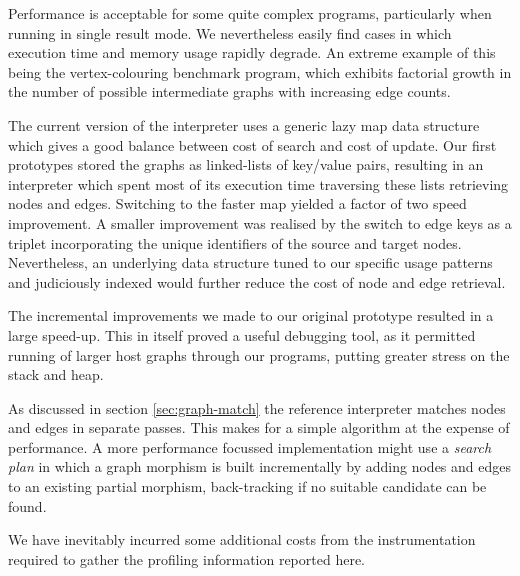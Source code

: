 Performance is acceptable for some quite complex programs, particularly when running in single result mode. We nevertheless easily find cases in which execution time and memory usage rapidly degrade. An extreme example of this being the vertex-colouring benchmark program, which exhibits factorial growth in the number of possible intermediate graphs with increasing edge counts.

The current version of the interpreter uses a generic lazy map data structure which gives a good balance between cost of search and cost of update. Our first prototypes stored the graphs as linked-lists of key/value pairs, resulting in an interpreter which spent most of its execution time traversing these lists retrieving nodes and edges. Switching to the faster map yielded a factor of two speed improvement. A smaller improvement was realised by the switch to edge keys as a triplet incorporating the unique identifiers of the source and target nodes. Nevertheless, an underlying data structure tuned to our specific usage patterns and judiciously indexed would further reduce the cost of node and edge retrieval.

The incremental improvements we made to our original prototype resulted in a large speed-up. This in itself proved a useful debugging tool, as it permitted running of larger host graphs through our programs, putting greater stress on the stack and heap.

As discussed in section \ref{sec:graph-match} the reference interpreter matches nodes and edges in separate passes. This makes for a simple algorithm at the expense of performance. A more performance focussed implementation might use a \textit{search plan}\cite{Horvath-Varro07} in which a graph morphism is built incrementally by adding nodes and edges to an existing partial morphism, back-tracking if no suitable candidate can be found.




We have inevitably incurred some additional costs from the instrumentation required to gather the profiling information reported here.








